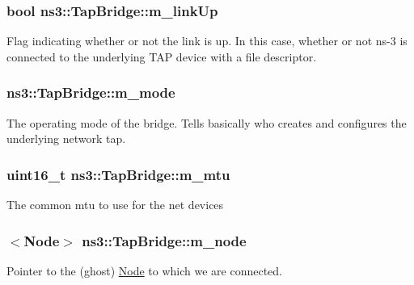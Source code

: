 \subsubsection[{\texorpdfstring{m\+\_\+link\+Up}{m_linkUp}}]{\setlength{\rightskip}{0pt plus 5cm}bool ns3\+::\+Tap\+Bridge\+::m\+\_\+link\+Up\hspace{0.3cm}{\ttfamily [private]}}\hypertarget{classns3_1_1TapBridge_a335b96cae7f60f5d5bcf60234af96339}{}\label{classns3_1_1TapBridge_a335b96cae7f60f5d5bcf60234af96339}
Flag indicating whether or not the link is up. In this case, whether or not ns-\/3 is connected to the underlying T\+AP device with a file descriptor. 
\subsubsection[{\texorpdfstring{m\+\_\+mode}{m_mode}}]{ ns3\+::\+Tap\+Bridge\+::m\+\_\+mode\hspace{0.3cm}{\ttfamily [private]}}\hypertarget{classns3_1_1TapBridge_aaae30bc9d5dd36e3a4d569cf9bcf40eb}{}\label{classns3_1_1TapBridge_aaae30bc9d5dd36e3a4d569cf9bcf40eb}
The operating mode of the bridge. Tells basically who creates and configures the underlying network tap. 
\subsubsection[{\texorpdfstring{m\+\_\+mtu}{m_mtu}}]{\setlength{\rightskip}{0pt plus 5cm}uint16\+\_\+t ns3\+::\+Tap\+Bridge\+::m\+\_\+mtu\hspace{0.3cm}{\ttfamily [private]}}\hypertarget{classns3_1_1TapBridge_a8aca7b3808d23f6a5f8e6c212c0af618}{}\label{classns3_1_1TapBridge_a8aca7b3808d23f6a5f8e6c212c0af618}
The common mtu to use for the net devices 
\subsubsection[{\texorpdfstring{m\+\_\+node}{m_node}}]{$<${\bf Node}$>$ ns3\+::\+Tap\+Bridge\+::m\+\_\+node\hspace{0.3cm}{\ttfamily [private]}}\hypertarget{classns3_1_1TapBridge_aab85ad5d27b8de91e7a02e8d8ee4332e}{}\label{classns3_1_1TapBridge_aab85ad5d27b8de91e7a02e8d8ee4332e}
Pointer to the (ghost) \hyperlink{classns3_1_1Node}{Node} to which we are connected. 
